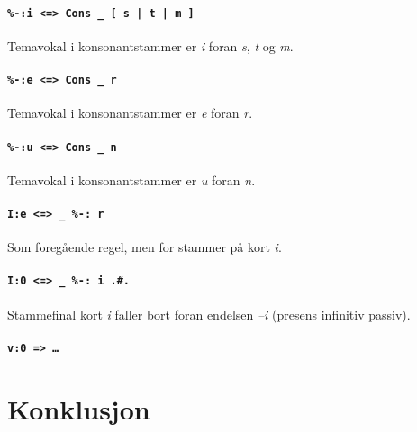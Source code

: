\documentclass{article}
\begin{document}
\paragraph{\texttt{\%-:i <=> Cons \_ [ s | t | m ]}} Temavokal i
konsonantstammer er \emph{i} foran \emph{s}, \emph{t} og \emph{m}.

\paragraph{\texttt{\%-:e <=> Cons \_ r}} Temavokal i konsonantstammer er
\emph{e} foran \emph{r}.

\paragraph{\texttt{\%-:u <=> Cons \_ n}} Temavokal i konsonantstammer er
\emph{u} foran \emph{n}.

\paragraph{\texttt{I:e <=> \_ \%-: r}} Som foreg\aa{}ende regel, men for
stammer p\aa{} kort \emph{i}.

\paragraph{\texttt{I:0 <=> \_ \%-: i .\#.}} Stammefinal kort \emph{i} faller
bort foran endelsen \emph{--i} (presens infinitiv passiv).

\paragraph{\texttt{v:0 => \ldots}}

\paragraph{\texttt{}}
\paragraph{\texttt{}}
\paragraph{\texttt{}}
\paragraph{\texttt{}}
\paragraph{\texttt{}}
\paragraph{\texttt{}}

\section{Konklusjon} %

\clearpage
{}
\end{document}
